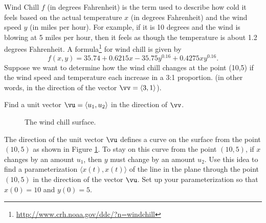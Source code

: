 \begin{pa} \label{PA:10.6} Wind Chill $f$ (in degrees Fahrenheit) is the term used to describe how cold it feels based on the actual temperature $x$ (in degrees Fahrenheit) and the wind speed $y$ (in miles per hour). For example, if it is 10 degrees and the wind is blowing at 5 miles per hour, then it feels as though the temperature is about 1.2 degrees Fahrenheit. A formula\footnote{\url{http://www.crh.noaa.gov/ddc/?n=windchill}} for wind chill is given by
\[f(x, y) = 35.74+0.6215x-35.75y^{0.16}+0.4275xy^{0.16}.\]
Suppose we want to determine how the wind chill changes at the point (10,5) if the wind speed and temperature each increase in a 3:1 proportion.  (in other words, in the direction of the vector $\vv = \langle 3,1 \rangle$).
    \ba
    \item Find a unit vector $\vu = \langle u_1, u_2 \rangle$ in the direction of $\vv$.



\begin{comment}

We find a unit vector in the direction of $\vv$ by dividing $\vv$ by its magnitude. So
\[\vu = \left(\frac{1}{\sqrt{10}}\right) \langle 3,1 \rangle.\]



\end{comment}


\begin{figure}[h]
\begin{center}
\end{center}
\caption{The wind chill surface.}
\label{F:10.6.Wind_chill}
\end{figure}

    \item The direction of the unit vector $\vu$ defines a curve on the surface from the point $(10,5)$ as shown in Figure \ref{F:10.6.Wind_chill}. To stay on this curve from the point $(10,5)$, if $x$ changes by an amount $u_1$, then $y$ must change by an amount $u_2$. Use this idea to find a parameterization $\langle x(t), x(t) \rangle$ of the line in the plane through the point $(10,5)$ in the direction of the vector $\vu$. Set up your parameterization so that $x(0) = 10$ and $y(0) = 5$.

\begin{comment}


\end{comment}
\end{pa}
